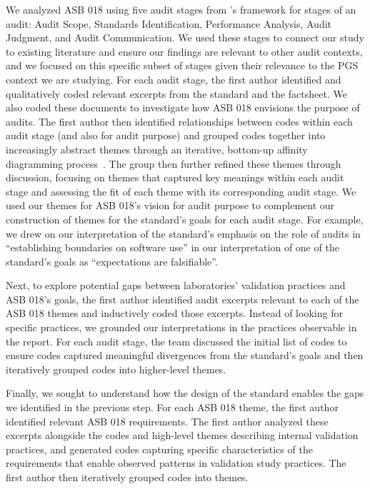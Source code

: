 We analyzed ASB 018 using five audit stages from \citet{ojewale2025towards}'s framework for stages of an audit: Audit Scope, Standards Identification, Performance Analysis, Audit Judgment, and Audit Communication. We used these stages to connect our study to existing literature and ensure our findings are relevant to other audit contexts, and we focused on this specific subset of stages given their relevance to the PGS context we are studying. For each audit stage, the first author identified and qualitatively coded relevant excerpts from the standard and the factsheet. We also coded these documents to investigate how ASB 018 envisions the purpose of audits. The first author then identified relationships between codes within each audit stage (and also for audit purpose) and grouped codes together into increasingly abstract themes through an iterative, bottom-up affinity diagramming process~\cite{beyer1999contextual}. The group then further refined these themes through discussion, focusing on themes that captured key meanings within each audit stage and assessing the fit of each theme with its corresponding audit stage. We used our themes for ASB 018's vision for audit purpose to complement our construction of themes for the standard's goals for each audit stage. For example, we drew on our interpretation of the standard's emphasis on the role of audits in ``establishing boundaries on software use'' in our interpretation of one of the standard's goals as ``expectations are falsifiable''.

Next, to explore potential gaps between laboratories' validation practices and ASB 018's goals, the first author identified audit excerpts relevant to each of the ASB 018 themes and inductively coded those excerpts. Instead of looking for specific practices, we grounded our interpretations in the practices observable in the report. For each audit stage, the team discussed the initial list of codes to ensure codes captured meaningful divergences from the standard's goals and then iteratively grouped codes into higher-level themes. 


Finally, we sought to understand how the design of the standard enables the gaps we identified in the previous step. For each ASB 018 theme, the first author identified relevant ASB 018 requirements. The first author analyzed these excerpts alongside the codes and high-level themes describing internal validation practices, and generated codes capturing specific characteristics of the requirements that enable observed patterns in validation study practices. The first author then iteratively grouped codes into themes. 


